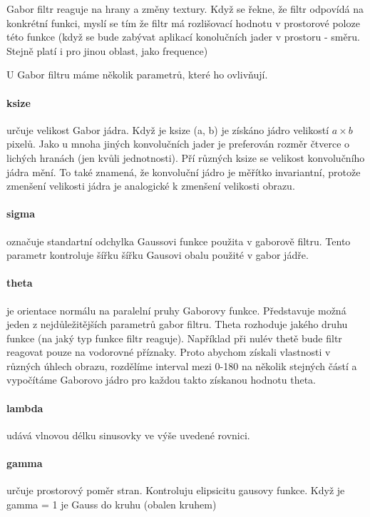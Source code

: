 \documentclass[czech,BP]{thesiskiv}
\begin{document}
Gabor filtr reaguje na hrany a změny textury. Když se řekne, že filtr odpovídá na konkrétní funkci, myslí se tím že filtr má rozlišovací hodnotu v prostorové poloze této funkce (když se bude zabývat aplikací konolučních jader v prostoru - směru. Stejně platí i pro jinou oblast, jako frequence)

U Gabor filtru máme několik parametrů, které ho ovlivňují. 
\paragraph{ksize} určuje velikost Gabor jádra. Když je ksize (a, b) je získáno jádro velikostí $a \times b$ pixelů. Jako u mnoha jiných konvolučních jader je preferován rozměr čtverce o lichých hranách (jen kvůli jednotnosti). Pří různých ksize se velikost konvolučního jádra mění. To také znamená, že konvoluční jádro je měřítko invariantní, protože zmenšení velikosti jádra je analogické k zmenšení velikosti obrazu. 

\paragraph{sigma} označuje standartní odchylka Gaussovi funkce použita v gaborově filtru. Tento parametr kontroluje šířku šířku Gausovi obalu použité v gabor jádře.

\paragraph{theta} je orientace normálu na paralelní pruhy Gaborovy funkce. Představuje možná jeden z nejdůležitějších parametrů gabor filtru. Theta rozhoduje jakého druhu funkce (na jaký typ funkce filtr reaguje). Například při nulév thetě bude filtr reagovat pouze na vodorovné příznaky. Proto abychom získali vlastnosti v různých úhlech obrazu, rozdělíme interval mezi 0-180 na několik stejných částí a vypočítáme Gaborovo jádro pro každou takto získanou hodnotu theta.

\paragraph{lambda} udává vlnovou délku sinusovky ve výše uvedené rovnici.

\paragraph{gamma} určuje prostorový poměr stran. Kontroluju elipsicitu gausovy funkce. Když je gamma = 1 je Gauss do kruhu (obalen kruhem)
\end{document}
